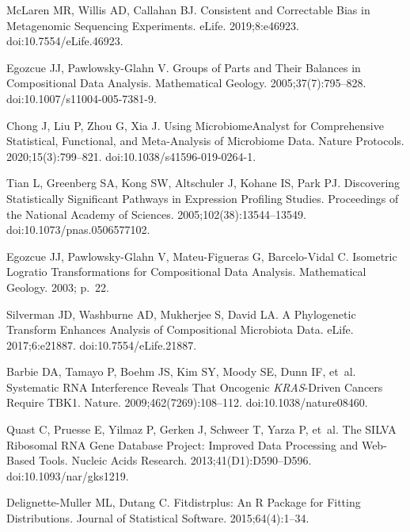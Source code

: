 \documentclass[10pt,letterpaper]{article}
\begin{document}
\begin{thebibliography}{10}
McLaren MR, Willis AD, Callahan BJ.
\newblock Consistent and Correctable Bias in Metagenomic Sequencing
  Experiments.
\newblock eLife. 2019;8:e46923.
\newblock doi:{10.7554/eLife.46923}.

Egozcue JJ, {Pawlowsky-Glahn} V.
\newblock Groups of {{Parts}} and {{Their Balances}} in {{Compositional Data
  Analysis}}.
\newblock Mathematical Geology. 2005;37(7):795--828.
\newblock doi:{10.1007/s11004-005-7381-9}.

Chong J, Liu P, Zhou G, Xia J.
\newblock Using {{MicrobiomeAnalyst}} for Comprehensive Statistical,
  Functional, and Meta-Analysis of Microbiome Data.
\newblock Nature Protocols. 2020;15(3):799--821.
\newblock doi:{10.1038/s41596-019-0264-1}.

Tian L, Greenberg SA, Kong SW, Altschuler J, Kohane IS, Park PJ.
\newblock Discovering Statistically Significant Pathways in Expression
  Profiling Studies.
\newblock Proceedings of the National Academy of Sciences.
  2005;102(38):13544--13549.
\newblock doi:{10.1073/pnas.0506577102}.

Egozcue JJ, {Pawlowsky-Glahn} V, {Mateu-Figueras} G, {Barcelo-Vidal} C.
\newblock Isometric {{Logratio Transformations}} for {{Compositional Data
  Analysis}}.
\newblock Mathematical Geology. 2003; p.~22.

Silverman JD, Washburne AD, Mukherjee S, David LA.
\newblock A Phylogenetic Transform Enhances Analysis of Compositional
  Microbiota Data.
\newblock eLife. 2017;6:e21887.
\newblock doi:{10.7554/eLife.21887}.

Barbie DA, Tamayo P, Boehm JS, Kim SY, Moody SE, Dunn IF, et~al.
\newblock Systematic {{RNA}} Interference Reveals That Oncogenic
  {{{\emph{KRAS}}}}-Driven Cancers Require {{TBK1}}.
\newblock Nature. 2009;462(7269):108--112.
\newblock doi:{10.1038/nature08460}.

Quast C, Pruesse E, Yilmaz P, Gerken J, Schweer T, Yarza P, et~al.
\newblock The {{SILVA}} Ribosomal {{RNA}} Gene Database Project: Improved Data
  Processing and Web-Based Tools.
\newblock Nucleic Acids Research. 2013;41(D1):D590--D596.
\newblock doi:{10.1093/nar/gks1219}.

{Delignette-Muller} ML, Dutang C.
\newblock Fitdistrplus: {{An R}} Package for Fitting Distributions.
\newblock Journal of Statistical Software. 2015;64(4):1--34.


\end{thebibliography}
\end{document}
